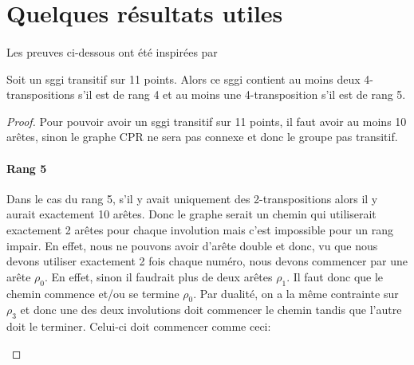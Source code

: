 \section{Quelques résultats utiles}

\paragraph{}
Les preuves ci-dessous ont été inspirées par~\cite{leemansTransactions}

\begin{lemma}
  Soit un sggi transitif sur 11 points. Alors ce sggi contient au moins deux 4-transpositions s'il est de rang 4 et au moins une 4-transposition s'il est de rang 5.
\end{lemma}

\begin{proof}
  Pour pouvoir avoir un sggi transitif sur 11 points, il faut avoir au moins 10 arêtes, sinon le graphe CPR ne sera pas connexe et donc le groupe pas transitif.

  \paragraph{Rang 5}
  Dans le cas du rang 5, s'il y avait uniquement des 2-transpositions alors il y aurait exactement 10 arêtes. Donc le graphe serait un chemin qui utiliserait exactement 2 arêtes pour chaque involution mais c'est impossible pour un rang impair. En effet, nous ne pouvons avoir d'arête double et donc, vu que nous devons utiliser exactement 2 fois chaque numéro, nous devons commencer par une arête $\rho_0$. En effet, sinon il faudrait plus de deux arêtes $\rho_1$. Il faut donc que le chemin commence et/ou se termine $\rho_0$. Par dualité, on a la même contrainte sur $\rho_3$ et donc une des deux involutions doit commencer le chemin tandis que l'autre doit le terminer. Celui-ci doit commencer comme ceci:

  \begin{figure}[H]
    \begin{center}
\end{center}
\end{figure}
\end{proof}
